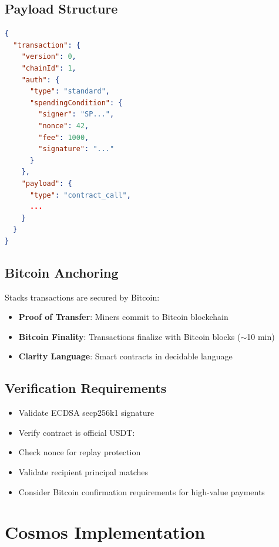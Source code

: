 \subsection{Payload Structure}

\begin{lstlisting}[language=json,caption={Stacks exact scheme payload}]
{
  "transaction": {
    "version": 0,
    "chainId": 1,
    "auth": {
      "type": "standard",
      "spendingCondition": {
        "signer": "SP...",
        "nonce": 42,
        "fee": 1000,
        "signature": "..."
      }
    },
    "payload": {
      "type": "contract_call",
      ...
    }
  }
}
\end{lstlisting}

\subsection{Bitcoin Anchoring}

Stacks transactions are secured by Bitcoin:

\begin{itemize}
    \item \textbf{Proof of Transfer}: Miners commit to Bitcoin blockchain
    \item \textbf{Bitcoin Finality}: Transactions finalize with Bitcoin blocks ($\sim$10 min)
    \item \textbf{Clarity Language}: Smart contracts in decidable language
\end{itemize}

\subsection{Verification Requirements}

\begin{itemize}
    \item Validate ECDSA secp256k1 signature
    \item Verify contract is official USDT: 
    \item Check nonce for replay protection
    \item Validate recipient principal matches 
    \item Consider Bitcoin confirmation requirements for high-value payments
\end{itemize}

\section{Cosmos Implementation}
\label{sec:cosmos-implementation}

